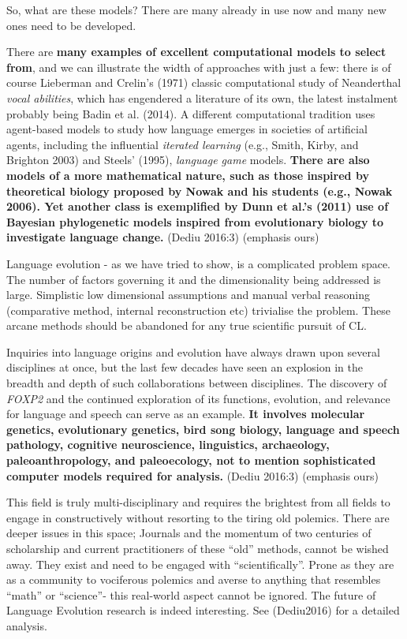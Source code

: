 So, what are these models? There are many already in use now and many new ones need to be developed.

\begin{myquote}
There are \textbf{many examples of excellent computational models to select from}, and we can illustrate the width of approaches with just a few: there is of course Lieberman and Crelin’s (1971) classic computational study of Neanderthal \textit{vocal abilities}, which has engendered a literature of its own, the latest instalment probably being Badin et al. (2014). A different computational tradition uses agent-based models to study how language emerges in societies of artificial agents, including the influential \textit{iterated learning} (e.g., Smith, Kirby, and Brighton 2003) and Steels’ (1995), \textit{language game} models. \textbf{There are also models of a more mathematical nature, such as those inspired by theoretical biology proposed by Nowak and his students (e.g., Nowak 2006). Yet another class is exemplified by Dunn et al.’s (2011) use of Bayesian phylogenetic models inspired from evolutionary biology to investigate language change.} (Dediu 2016:3) (emphasis ours)
\end{myquote}

Language evolution - as we have tried to show, is a complicated problem space. The number of factors governing it and the dimensionality being addressed is large. Simplistic low dimensional assumptions and manual verbal reasoning (comparative method, internal reconstruction etc) trivialise the problem. These arcane methods should be abandoned for any true scientific pursuit of CL.

\begin{myquote}
Inquiries into language origins and evolution have always drawn upon several disciplines at once, but the last few decades have seen an explosion in the breadth and depth of such collaborations between disciplines. The discovery of \textit{FOXP2} and the continued exploration of its functions, evolution, and relevance for language and speech can serve as an example. \textbf{It involves molecular genetics, evolutionary genetics, bird song biology, language and speech pathology, cognitive neuroscience, linguistics, archaeology, paleoanthropology, and paleoecology, not to mention sophisticated computer models required for analysis.} (Dediu 2016:3) (emphasis ours)
\end{myquote}

This field is truly multi-disciplinary and requires the brightest from all fields to engage in constructively without resorting to the tiring old polemics. There are deeper issues in this space; Journals and the momentum of two centuries of scholarship and current practitioners of these “old” methods, cannot be wished away. They exist and need to be engaged with “scientifically”. Prone as they are as a community to vociferous polemics and averse to anything that resembles “math” or “science”- this real-world aspect cannot be ignored. The future of Language Evolution research is indeed interesting. See (Dediu2016) for a detailed analysis.


